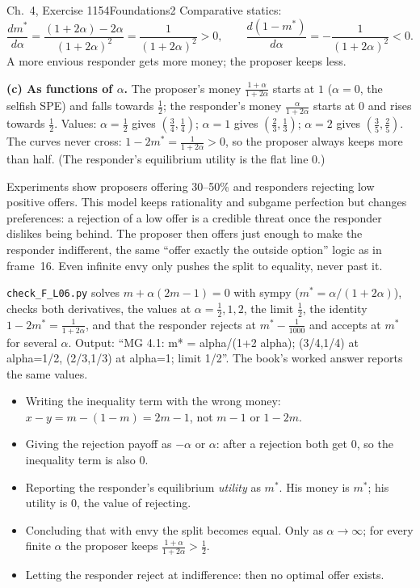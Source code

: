 \begin{exsol}{\MG{} Ch.~4, Exercise 1}{154}{Foundations}{2}
Comparative statics:
\[
  \frac{d m^*}{d\alpha} = \frac{(1+2\alpha) - 2\alpha}{(1+2\alpha)^2} = \frac{1}{(1+2\alpha)^2} > 0,
  \qquad \frac{d(1 - m^*)}{d\alpha} = -\frac{1}{(1+2\alpha)^2} < 0 .
\]
A more envious responder gets more money; the proposer keeps less.

\textbf{(c) As functions of $\alpha$.} The proposer's money $\frac{1+\alpha}{1+2\alpha}$ starts at
$1$ ($\alpha = 0$, the selfish SPE) and falls towards $\frac12$; the responder's money
$\frac{\alpha}{1+2\alpha}$ starts at $0$ and rises towards $\frac12$. Values: $\alpha = \frac12$ gives
$(\frac34, \frac14)$; $\alpha = 1$ gives $(\frac23, \frac13)$; $\alpha = 2$ gives $(\frac35, \frac25)$.
The curves never cross: $1 - 2m^* = \frac{1}{1+2\alpha} > 0$, so the proposer always keeps more
than half. (The responder's equilibrium utility is the flat line $0$.)

\interp Experiments show proposers offering 30--50\% and responders rejecting low positive offers.
This model keeps rationality and subgame perfection but changes preferences: a rejection of a low
offer is a credible threat once the responder dislikes being behind. The proposer then offers just
enough to make the responder indifferent, the same ``offer exactly the outside option'' logic as in
frame~16. Even infinite envy only pushes the split to equality, never past it.

\verify \texttt{check\_F\_L06.py} solves $m + \alpha(2m-1) = 0$ with sympy ($m^* =
\alpha/(1+2\alpha)$), checks both derivatives, the values at $\alpha = \frac12, 1, 2$, the limit
$\frac12$, the identity $1 - 2m^* = \frac{1}{1+2\alpha}$, and that the responder rejects at $m^* -
\frac1{1000}$ and accepts at $m^*$ for several $\alpha$. Output: ``MG 4.1: m* = alpha/(1+2 alpha);
(3/4,1/4) at alpha=1/2, (2/3,1/3) at alpha=1; limit 1/2''. The book's worked answer reports the
same values.

\mistakes
\begin{itemize}
  \item Writing the inequality term with the wrong money: $x - y = m - (1 - m) = 2m - 1$, not
  $m - 1$ or $1 - 2m$.
  \item Giving the rejection payoff as $-\alpha$ or $\alpha$: after a rejection both get $0$, so the
  inequality term is also $0$.
  \item Reporting the responder's equilibrium \emph{utility} as $m^*$. His money is $m^*$; his utility
  is $0$, the value of rejecting.
  \item Concluding that with envy the split becomes equal. Only as $\alpha \to \infty$; for every
  finite $\alpha$ the proposer keeps $\frac{1+\alpha}{1+2\alpha} > \frac12$.
  \item Letting the responder reject at indifference: then no optimal offer exists.
\end{itemize}


\end{exsol}
